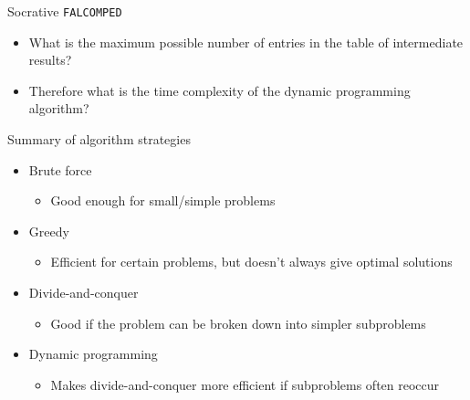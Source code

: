 \begin{frame}{Socrative \texttt{FALCOMPED}}
	\begin{itemize}
		\pause\item What is the maximum possible number of entries in the table of intermediate results?
		\pause\item Therefore what is the time complexity of the dynamic programming algorithm?
	\end{itemize}
\end{frame}

\begin{frame}{Summary of algorithm strategies}
	\begin{itemize}
		\pause\item Brute force
			\begin{itemize}
				\pause\item Good enough for small/simple problems
			\end{itemize}
		\pause\item Greedy
			\begin{itemize}
				\pause\item Efficient for certain problems, but doesn't always give optimal solutions
			\end{itemize}
		\pause\item Divide-and-conquer
			\begin{itemize}
				\pause\item Good if the problem can be broken down into simpler subproblems
			\end{itemize}
		\pause\item Dynamic programming
			\begin{itemize}
				\pause\item Makes divide-and-conquer more efficient if subproblems often reoccur
			\end{itemize}
	\end{itemize}
\end{frame}

